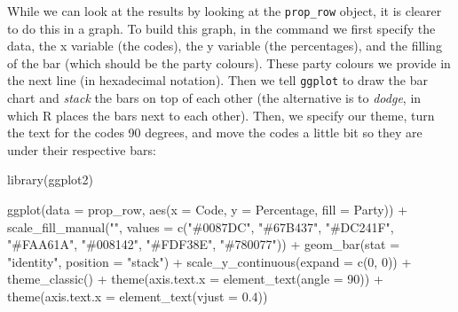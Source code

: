 \documentclass[
]{book}
\newenvironment{Shaded}{\begin{snugshade}}{\end{snugshade}}
\newcommand{\AttributeTok}[1]{\textcolor[rgb]{0.77,0.63,0.00}{#1}}
\newcommand{\DecValTok}[1]{\textcolor[rgb]{0.00,0.00,0.81}{#1}}
\newcommand{\FloatTok}[1]{\textcolor[rgb]{0.00,0.00,0.81}{#1}}
\newcommand{\FunctionTok}[1]{\textcolor[rgb]{0.00,0.00,0.00}{#1}}
\newcommand{\NormalTok}[1]{#1}
\newcommand{\OtherTok}[1]{\textcolor[rgb]{0.56,0.35,0.01}{#1}}
\newcommand{\SpecialCharTok}[1]{\textcolor[rgb]{0.00,0.00,0.00}{#1}}
\newcommand{\StringTok}[1]{\textcolor[rgb]{0.31,0.60,0.02}{#1}}
\begin{document}
\begin{Shaded}
\end{Shaded}

While we can look at the results by looking at the \texttt{prop\_row} object, it is clearer to do this in a graph. To build this graph, in the command we first specify the data, the x variable (the codes), the y variable (the percentages), and the filling of the bar (which should be the party colours). These party colours we provide in the next line (in hexadecimal notation). Then we tell \texttt{ggplot} to draw the bar chart and \emph{stack} the bars on top of each other (the alternative is to \emph{dodge}, in which R places the bars next to each other). Then, we specify our theme, turn the text for the codes 90 degrees, and move the codes a little bit so they are under their respective bars:

\begin{Shaded}
\begin{Highlighting}[]
\FunctionTok{library}\NormalTok{(ggplot2)}

\FunctionTok{ggplot}\NormalTok{(}\AttributeTok{data =}\NormalTok{ prop\_row, }\FunctionTok{aes}\NormalTok{(}\AttributeTok{x =}\NormalTok{ Code, }\AttributeTok{y =}\NormalTok{ Percentage, }\AttributeTok{fill =}\NormalTok{ Party)) }\SpecialCharTok{+}
    \FunctionTok{scale\_fill\_manual}\NormalTok{(}\StringTok{""}\NormalTok{, }\AttributeTok{values =} \FunctionTok{c}\NormalTok{(}\StringTok{"\#0087DC"}\NormalTok{, }\StringTok{"\#67B437"}\NormalTok{, }\StringTok{"\#DC241F"}\NormalTok{,}
        \StringTok{"\#FAA61A"}\NormalTok{, }\StringTok{"\#008142"}\NormalTok{, }\StringTok{"\#FDF38E"}\NormalTok{, }\StringTok{"\#780077"}\NormalTok{)) }\SpecialCharTok{+} \FunctionTok{geom\_bar}\NormalTok{(}\AttributeTok{stat =} \StringTok{"identity"}\NormalTok{,}
    \AttributeTok{position =} \StringTok{"stack"}\NormalTok{) }\SpecialCharTok{+} \FunctionTok{scale\_y\_continuous}\NormalTok{(}\AttributeTok{expand =} \FunctionTok{c}\NormalTok{(}\DecValTok{0}\NormalTok{, }\DecValTok{0}\NormalTok{)) }\SpecialCharTok{+}
    \FunctionTok{theme\_classic}\NormalTok{() }\SpecialCharTok{+} \FunctionTok{theme}\NormalTok{(}\AttributeTok{axis.text.x =} \FunctionTok{element\_text}\NormalTok{(}\AttributeTok{angle =} \DecValTok{90}\NormalTok{)) }\SpecialCharTok{+}
    \FunctionTok{theme}\NormalTok{(}\AttributeTok{axis.text.x =} \FunctionTok{element\_text}\NormalTok{(}\AttributeTok{vjust =} \FloatTok{0.4}\NormalTok{))}
\end{Highlighting}
\end{Shaded}
\end{document}
